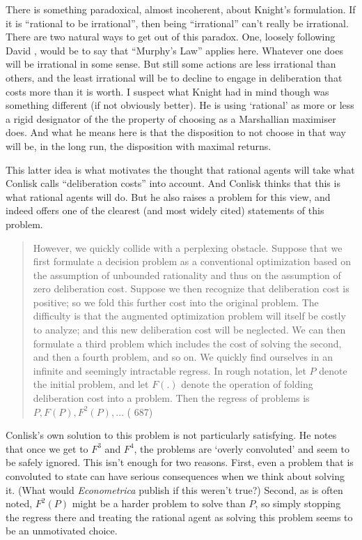 \documentclass[11pt,]{book}
\begin{document}
There is something paradoxical, almost incoherent, about Knight's formulation. If it is ``rational to be irrational'', then being ``irrational'' can't really be irrational. There are two natural ways to get out of this paradox. One, loosely following David \citet{Christensen2007}, would be to say that ``Murphy's Law'' applies here. Whatever one does will be irrational in some sense. But still some actions are less irrational than others, and the least irrational will be to decline to engage in deliberation that costs more than it is worth. I suspect what Knight had in mind though was something different (if not obviously better). He is using `rational' as more or less a rigid designator of the the property of choosing as a Marshallian maximiser does. And what he means here is that the disposition to not choose in that way will be, in the long run, the disposition with maximal returns.

This latter idea is what motivates the thought that rational agents will take what Conlisk calls ``deliberation costs'' into account. And Conlisk thinks that this is what rational agents will do. But he also raises a problem for this view, and indeed offers one of the clearest (and most widely cited) statements of this problem.

\begin{quote}
However, we quickly collide with a perplexing obstacle. Suppose that we first formulate a decision problem as a conventional optimization based on the assumption of unbounded rationality and thus on the assumption of zero deliberation cost. Suppose we then recognize that deliberation cost is positive; so we fold this further cost into the original problem. The difficulty is that the augmented optimization problem will itself be costly to analyze; and this new deliberation cost will be neglected. We can then formulate a third problem which includes the cost of solving the second, and then a fourth problem, and so on. We quickly find ourselves in an infinite and seemingly intractable regress. In rough notation, let \(P\) denote the initial problem, and let \(F(.)\) denote the operation of folding deliberation cost into a problem. Then the regress of problems is \(P, F(P), F^2(P), \ldots\) (\citet{Conlisk1996} 687)
\end{quote}

Conlisk's own solution to this problem is not particularly satisfying. He notes that once we get to \(F^3\) and \(F^4\), the problems are `overly convoluted' and seem to be safely ignored. This isn't enough for two reasons. First, even a problem that is convoluted to state can have serious consequences when we think about solving it. (What would \emph{Econometrica} publish if this weren't true?) Second, as is often noted, \(F^2(P)\) might be a harder problem to solve than \(P\), so simply stopping the regress there and treating the rational agent as solving this problem seems to be an unmotivated choice.
\end{document}
